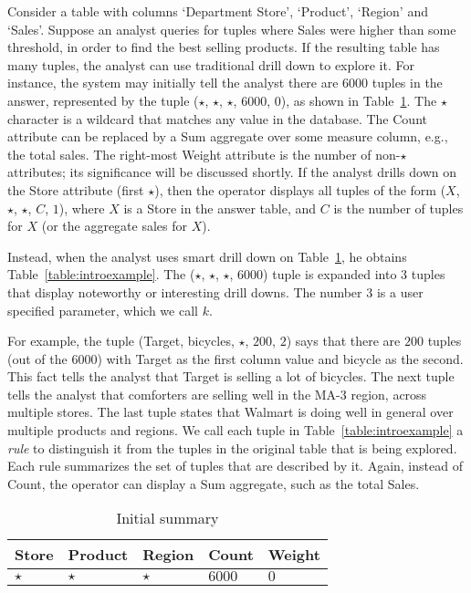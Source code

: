 \begin{example}\label{ex:introexample}
Consider a table with columns `Department Store', `Product', `Region'
and `Sales'. Suppose an analyst queries for tuples
where Sales were higher than some threshold, in order
to find the best selling products.
If the resulting table has many tuples,
the analyst can use traditional drill down to explore it.
For instance, the system may initially tell the analyst there are
6000 tuples in the answer, represented by the tuple ($\star$, $\star$, $\star$, $6000$, $0$),
as shown in Table~\ref{table:introexample0}.
The $\star$ character is a wildcard that matches any value in the database.
The Count attribute can be replaced by a Sum aggregate over some measure column,
e.g., the total sales.
The right-most Weight attribute is the number of non-$\star$ attributes; 
its significance will be discussed shortly.
If the analyst drills down on the Store attribute (first $\star$),
then the operator displays all tuples of the form ($X$, $\star$, $\star$, $C$, $1$),
where $X$ is a Store in the answer table, and $C$
is the number of tuples for $X$ (or the aggregate sales for $X$).

Instead, when the analyst uses smart drill down on Table~\ref{table:introexample0},
he obtains Table~\ref{table:introexample}.
The ($\star$, $\star$, $\star$, $6000$) tuple is expanded into $3$ tuples
that display noteworthy or interesting drill downs.
The number $3$ is a user specified parameter, which we call $k$.

For example, the tuple (Target, bicycles, $\star$, $200$, $2$)
says that there are $200$ tuples (out of the 6000) with
Target as the first column value and bicycle as the second.
This fact tells the analyst that Target is selling a lot of bicycles.
The next tuple tells the analyst that comforters are selling well in
the MA-3 region, across multiple stores. The last tuple
states that Walmart is doing well in general over multiple products and regions.
We call each tuple in Table~\ref{table:introexample} a {\em rule}
to distinguish it from the tuples in the original table that is being explored.
Each rule summarizes the set of tuples that are described by it.
Again, instead of Count, the operator can display a Sum aggregate, such as
the total Sales.

\begin{table}
\scriptsize
\centering
\begin{tabular}{| l | l | l | l | l |}
\hline Store & Product & Region & Count & Weight \\
\hline
$\star$ & $\star$ & $\star$ & $6000$ & $0$ \\ \hline
\end{tabular}
\caption{Initial summary}\label{table:introexample0}
\end{table}


\end{example}
